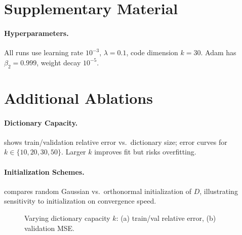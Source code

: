 \documentclass{article}
\begin{document}



\appendix
\section*{Supplementary Material}
\paragraph{Hyperparameters.}
All runs use learning rate $10^{-3}$, $\lambda=0.1$, code dimension $k=30$.  Adam has $\beta_2=0.999$, weight decay $10^{-5}$.

\section{Additional Ablations}
\paragraph{Dictionary Capacity.}
 shows train/validation relative error vs.\ dictionary size; error curves for $k\in\{10,20,30,50\}$.  Larger $k$ improves fit but risks overfitting.

\paragraph{Initialization Schemes.}
 compares random Gaussian vs.\ orthonormal initialization of $D$, illustrating sensitivity to initialization on convergence speed.

\begin{figure}[h]
  \centering
  \caption{Varying dictionary capacity $k$: (a) train/val relative error, (b) validation MSE.}
  \label{fig:dict_cap}
\end{figure}
\end{document}
